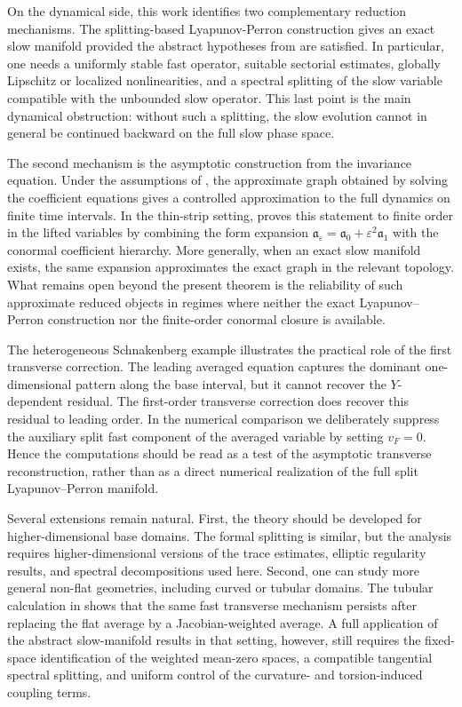 \documentclass[11pt]{article}
\theoremstyle{definition}
\theoremstyle{remark}
\numberwithin{equation}{section}
\begin{document}
On the dynamical side, this work identifies two complementary reduction
mechanisms. The splitting-based Lyapunov-Perron construction gives an exact
slow manifold provided the abstract hypotheses from  are
satisfied. In particular, one needs a uniformly stable fast operator, suitable
sectorial estimates, globally Lipschitz or localized nonlinearities, and a
spectral splitting of the slow variable compatible with the unbounded slow
operator. This last point is the main dynamical obstruction: without such a
splitting, the slow evolution cannot in general be continued backward on the
full slow phase space.

The second mechanism is the asymptotic construction from the invariance
equation. Under the assumptions of , the approximate graph
obtained by solving the coefficient equations gives a controlled approximation
to the full dynamics on finite time intervals. In the thin-strip setting,
 proves this statement to finite
order in the lifted variables by combining the form expansion
\(\mathfrak a_\varepsilon=\mathfrak a_0+\varepsilon^2\mathfrak a_1\) with the
conormal coefficient hierarchy. More generally, when an exact slow manifold
exists, the same expansion approximates the exact graph in the relevant
topology. What remains open beyond the present theorem is the reliability of
such approximate reduced objects in regimes where neither the exact
Lyapunov--Perron construction nor the finite-order conormal closure is
available.

The heterogeneous Schnakenberg example illustrates the practical role of the
first transverse correction. The leading averaged equation captures the
dominant one-dimensional pattern along the base interval, but it cannot
recover the \(Y\)-dependent residual. The first-order transverse correction
does recover this residual to leading order. In the numerical comparison we
deliberately suppress the auxiliary split fast component of the averaged
variable by setting \(v_F=0\). Hence the computations should be read as a test
of the asymptotic transverse reconstruction, rather than as a direct numerical
realization of the full split Lyapunov--Perron manifold.

Several extensions remain natural. First, the theory should be developed for
higher-dimensional base domains. The formal splitting is similar, but the
analysis requires higher-dimensional versions of the trace estimates,
elliptic regularity results, and spectral decompositions used here. Second,
one can study more general non-flat geometries, including curved or tubular
domains. The tubular calculation in  shows that the same
fast transverse mechanism persists after replacing the flat average by a
Jacobian-weighted average. A full application of the abstract slow-manifold
results in that setting, however, still requires the fixed-space
identification of the weighted mean-zero spaces, a compatible tangential
spectral splitting, and uniform control of the curvature- and torsion-induced
coupling terms.
\end{document}
